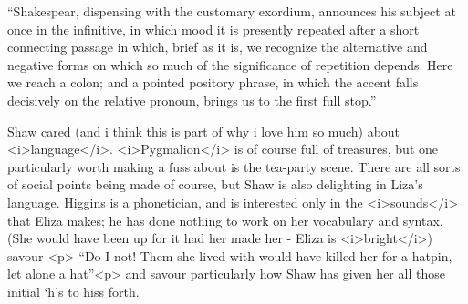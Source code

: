  ``Shakespear, dispensing with the customary exordium, announces his subject at once in the infinitive, in which mood it is presently repeated after a short connecting passage in which, brief as it is, we recognize the alternative and negative forms on which so much of the significance of repetition depends. Here we reach a colon; and a pointed pository phrase, in which the accent falls decisively on the relative pronoun, brings us to the first full stop.''


Shaw cared (and i think this is part of why i love him so much) about
<i>language</i>.  <i>Pygmalion</i> is of course full of treasures, but
one particularly worth making a fuss about is the tea-party scene.
There are all sorts of social points being made of course, but Shaw is
also delighting in Liza's language.  Higgins is a phonetician, and is
interested only in the <i>sounds</i> that Eliza makes; he has done
nothing to work on her vocabulary and syntax.  (She would have been up
for it had her made her - Eliza is <i>bright</i>) savour  <p>
``Do I not!  Them she lived with would have killed her for a hatpin, let alone a hat''<p>
and savour particularly how Shaw has given her all those initial `h's to hiss forth.
